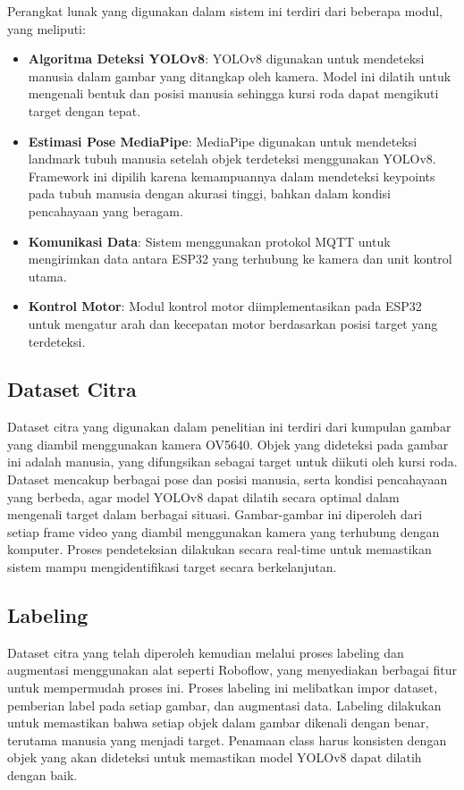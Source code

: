 Perangkat lunak yang digunakan dalam sistem ini terdiri dari beberapa modul, yang meliputi:

\begin{itemize}
    \item \textbf{Algoritma Deteksi YOLOv8}: YOLOv8 digunakan untuk mendeteksi manusia dalam gambar yang ditangkap oleh kamera. Model ini dilatih untuk mengenali bentuk dan posisi manusia sehingga kursi roda dapat mengikuti target dengan tepat.
    \item \textbf{Estimasi Pose MediaPipe}: MediaPipe digunakan untuk mendeteksi landmark tubuh manusia setelah objek terdeteksi menggunakan YOLOv8. Framework ini dipilih karena kemampuannya dalam mendeteksi keypoints pada tubuh manusia dengan akurasi tinggi, bahkan dalam kondisi pencahayaan yang beragam.
    \item \textbf{Komunikasi Data}: Sistem menggunakan protokol MQTT untuk mengirimkan data antara ESP32 yang terhubung ke kamera dan unit kontrol utama.
    \item \textbf{Kontrol Motor}: Modul kontrol motor diimplementasikan pada ESP32 untuk mengatur arah dan kecepatan motor berdasarkan posisi target yang terdeteksi.
\end{itemize}

\subsection{Dataset Citra}
\label{subsec:datasetcitra}

Dataset citra yang digunakan dalam penelitian ini terdiri dari kumpulan gambar yang diambil menggunakan kamera OV5640. Objek yang dideteksi pada gambar ini adalah manusia, yang difungsikan sebagai target untuk diikuti oleh kursi roda. Dataset mencakup berbagai pose dan posisi manusia, serta kondisi pencahayaan yang berbeda, agar model YOLOv8 dapat dilatih secara optimal dalam mengenali target dalam berbagai situasi. Gambar-gambar ini diperoleh dari setiap frame video yang diambil menggunakan kamera yang terhubung dengan komputer. Proses pendeteksian dilakukan secara real-time untuk memastikan sistem mampu mengidentifikasi target secara berkelanjutan.

\subsection{Labeling}
\label{subsec:labeling}

Dataset citra yang telah diperoleh kemudian melalui proses labeling dan augmentasi menggunakan alat seperti Roboflow, yang menyediakan berbagai fitur untuk mempermudah proses ini. Proses labeling ini melibatkan impor dataset, pemberian label pada setiap gambar, dan augmentasi data. Labeling dilakukan untuk memastikan bahwa setiap objek dalam gambar dikenali dengan benar, terutama manusia yang menjadi target. Penamaan class harus konsisten dengan objek yang akan dideteksi untuk memastikan model YOLOv8 dapat dilatih dengan baik.

